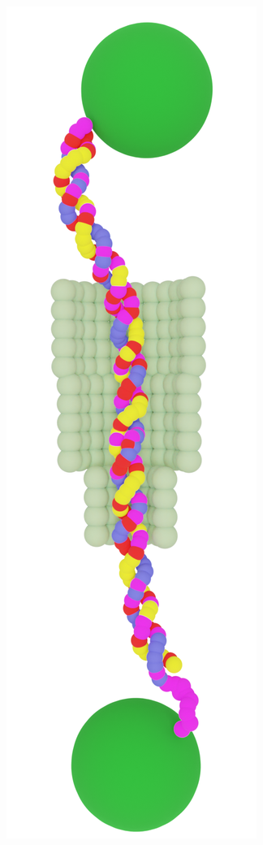\begin{figure}[ht]
\begin{centering}
\begin{subfigure}[t]{\dimexpr.21\linewidth-1.3em\relax}
  \centering
  \vspace{-0.5cm}
  \includegraphics[width=.5\linewidth,valign=t]{Figures/Rotaxane-90.png}
  \end{subfigure}
  \label{fig:test}
  \end{centering}

  \vspace{.01cm}


\end{figure}

